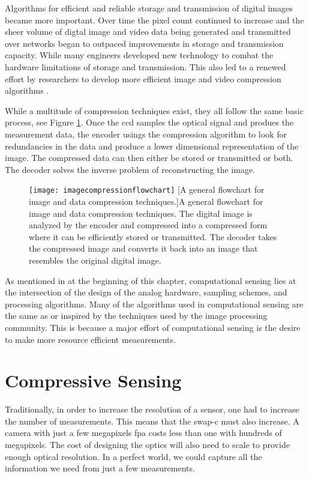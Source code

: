 Algorithms for efficient and reliable storage and transmission of digital images became more important. Over time the pixel count continued to increase and the sheer volume of digtal image and video data being generated and transmitted over networks began to outpaced improvements in storage and transmission capacity. While many engineers developed new technology to combat the hardware limitations of storage and transmission. This also led to a renewed effort by researchers to develop more efficient image and video compression algorithms \cite{kobayashi1974image, ziv1978compression}. 

While a multitude of compression techniques exist, they all follow the same basic process, see Figure \ref{fig:imagecompressionflowchart}. Once the \gls{ccd} samples the optical signal and produes the measurement data, the encoder usings the compression algorithm to look for redundancies in the data and produce a lower dimensional representation of the image. The compressed data can then either be stored or transmitted or both. The decoder solves the inverse problem of reconstructing the image. 

\begin{figure}
    \centering
    \texttt{[image: imagecompressionflowchart]}
    [A general flowchart for image and data compression techniques.]{A general flowchart for image and data compression techniques. The digital image is analyzed by the encoder and compressed into a compressed form where it can be efficiently stored or transmitted. The decoder takes the compressed image and converts it back into an image that resembles the original digital image. }
    \label{fig:imagecompressionflowchart}
\end{figure}

As mentioned in at the beginning of this chapter, computational sensing lies at the intersection of the design of the analog hardware, sampling schemes, and processing algorithms. Many of the algorithms used in computational sensing are the same as or inspired by the techniques used by the image processing community. This is because a major effort of computational sensing is the desire to make more resource efficient measurements. 

\section{Compressive Sensing}\label{sec:multiplexingtocompressivesensing}

Traditionally, in order to increase the resolution of a sensor, one had to increase the number of measurements. This means that the \gls{swap-c} must also increase. A camera with just a few megapixels \gls{fpa} costs less than one with hundreds of megapixels. The cost of designing the optics will also need to scale to provide enough optical resolution. In a perfect world, we could capture all the information we need from just a few measurements.

